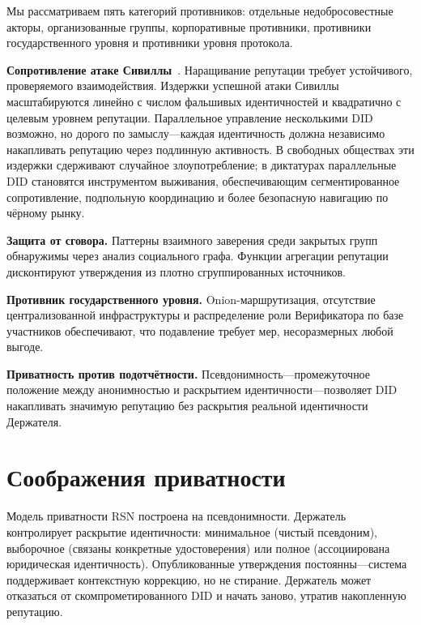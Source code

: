 \documentclass[11pt,a4paper,twocolumn]{article}
\begin{document}
Мы рассматриваем пять категорий противников: отдельные недобросовестные акторы, организованные группы, корпоративные противники, противники государственного уровня и противники уровня протокола.

\textbf{Сопротивление атаке Сивиллы}~\cite{douceur2002}. Наращивание репутации требует устойчивого, проверяемого взаимодействия. Издержки успешной атаки Сивиллы масштабируются линейно с числом фальшивых идентичностей и квадратично с целевым уровнем репутации. Параллельное управление несколькими DID возможно, но дорого по замыслу---каждая идентичность должна независимо накапливать репутацию через подлинную активность. В свободных обществах эти издержки сдерживают случайное злоупотребление; в диктатурах параллельные DID становятся инструментом выживания, обеспечивающим сегментированное сопротивление, подпольную координацию и более безопасную навигацию по чёрному рынку.

\textbf{Защита от сговора.} Паттерны взаимного заверения среди закрытых групп обнаружимы через анализ социального графа. Функции агрегации репутации дисконтируют утверждения из плотно сгруппированных источников.

\textbf{Противник государственного уровня.} Onion-маршрутизация, отсутствие централизованной инфраструктуры и распределение роли Верификатора по базе участников обеспечивают, что подавление требует мер, несоразмерных любой выгоде.

\textbf{Приватность против подотчётности.} Псевдонимность---промежуточное положение между анонимностью и раскрытием идентичности---позволяет DID накапливать значимую репутацию без раскрытия реальной идентичности Держателя.

\section{Соображения приватности}

Модель приватности RSN построена на псевдонимности. Держатель контролирует раскрытие идентичности: минимальное (чистый псевдоним), выборочное (связаны конкретные удостоверения) или полное (ассоциирована юридическая идентичность). Опубликованные утверждения постоянны---система поддерживает контекстную коррекцию, но не стирание. Держатель может отказаться от скомпрометированного DID и начать заново, утратив накопленную репутацию.

\end{document}

